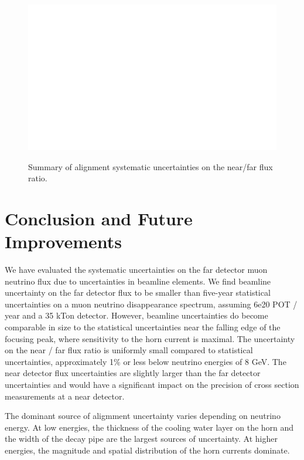 \begin{figure}[ht]
  \label{fig:error_summary_nof}
  \begin{center}
    {\includegraphics[width=6.0in]{figures/error_summary_nof.eps}}
  \end{center}
\caption{ Summary of alignment systematic uncertainties on the near/far flux ratio.}
\end{figure}



\section{Conclusion and Future Improvements}
\label{sec:conclusion}
We have evaluated the systematic uncertainties on the far detector muon neutrino flux due to uncertainties in beamline elements.  We find beamline uncertainty on the far detector flux to be smaller than five-year statistical uncertainties on a muon neutrino disappearance spectrum, assuming 6e20 POT / year and a 35 kTon detector.  However, beamline uncertainties do become comparable in size to the statistical uncertainties near the falling edge of the focusing peak, where sensitivity to the horn current is maximal. The uncertainty on the near / far flux ratio is uniformly small compared to statistical uncertainties, approximately 1\% or less below neutrino energies of 8 GeV.  The near detector flux uncertainties are slightly larger than the far detector uncertainties and would have a significant impact on the precision of cross section measurements at a near detector.

The dominant source of aligmment uncertainty varies depending on neutrino energy.  At low energies, the thickness of the cooling water layer on the horn and the width of the decay pipe are the largest sources of uncertainty. At higher energies, the magnitude and spatial distribution of the horn currents dominate.     


